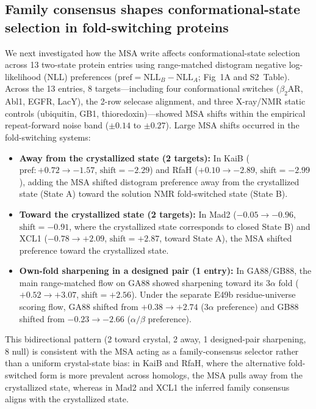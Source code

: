 \documentclass[10pt,a4paper]{article}
\begin{document}
\subsection{Family consensus shapes conformational-state selection in fold-switching proteins}

We next investigated how the MSA write affects conformational-state selection across 13 two-state protein entries using range-matched distogram negative log-likelihood (NLL) preferences ($\mathrm{pref} = \mathrm{NLL}_B - \mathrm{NLL}_A$; Fig~1A and S2~Table). Across the 13 entries, 8 targets---including four conformational switches ($\beta_2$AR, Abl1, EGFR, LacY), the 2-row selecase alignment, and three X-ray/NMR static controls (ubiquitin, GB1, thioredoxin)---showed MSA shifts within the empirical repeat-forward noise band ($\pm 0.14$ to $\pm 0.27$). Large MSA shifts occurred in the fold-switching systems:
\begin{itemize}
    \setlength{\itemsep}{2pt}\setlength{\parskip}{0pt}
    \item \textbf{Away from the crystallized state (2 targets):} In KaiB ($\mathrm{pref}: +0.72 \rightarrow -1.57$, $\text{shift} = -2.29$) and RfaH ($+0.10 \rightarrow -2.89$, $\text{shift} = -2.99$), adding the MSA shifted distogram preference away from the crystallized state (State A) toward the solution NMR fold-switched state (State B).
    \item \textbf{Toward the crystallized state (2 targets):} In Mad2 ($-0.05 \rightarrow -0.96$, $\text{shift} = -0.91$, where the crystallized state corresponds to closed State B) and XCL1 ($-0.78 \rightarrow +2.09$, $\text{shift} = +2.87$, toward State A), the MSA shifted preference toward the crystallized state.
    \item \textbf{Own-fold sharpening in a designed pair (1 entry):} In GA88/GB88, the main range-matched flow on GA88 showed sharpening toward its $3\alpha$ fold ($+0.52 \rightarrow +3.07$, $\text{shift} = +2.56$). Under the separate E49b residue-universe scoring flow, GA88 shifted from $+0.38 \rightarrow +2.74$ ($3\alpha$ preference) and GB88 shifted from $-0.23 \rightarrow -2.66$ ($\alpha/\beta$ preference).
\end{itemize}

This bidirectional pattern (2 toward crystal, 2 away, 1 designed-pair sharpening, 8 null) is consistent with the MSA acting as a family-consensus selector rather than a uniform crystal-state bias: in KaiB and RfaH, where the alternative fold-switched form is more prevalent across homologs, the MSA pulls away from the crystallized state, whereas in Mad2 and XCL1 the inferred family consensus aligns with the crystallized state.
\end{document}
